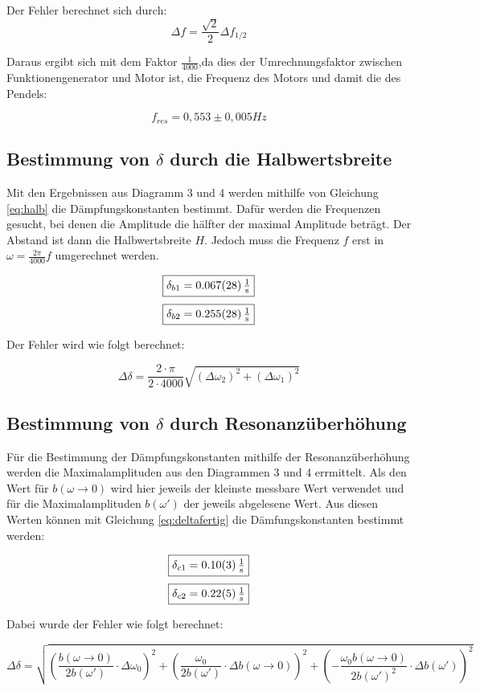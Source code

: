 Der Fehler berechnet sich durch:
\begin{equation}
    \Delta f = \frac{\sqrt{2}}{2}\Delta f_{1/2}
\end{equation}

Daraus ergibt sich mit dem Faktor $\frac{1}{4000}$,da dies der Umrechnungsfaktor zwischen Funktionengenerator und Motor ist, die Frequenz des Motors und damit die des Pendels:

\[\boxed{f_{res} = 0,553 \pm 0,005 \si{Hz}}\]

\subsection{Bestimmung von $\delta$ durch die Halbwertsbreite}

Mit den Ergebnissen aus Diagramm 3 und 4 werden mithilfe von Gleichung \ref{eq:halb} die Dämpfungskonstanten bestimmt.
Dafür werden die Frequenzen gesucht, bei denen die Amplitude die hälfter der maximal Amplitude beträgt. Der Abstand ist dann die Halbwertsbreite $H$.
Jedoch muss die Frequenz $f$ erst in $\omega = \frac{2 \pi}{4000} f$ umgerechnet werden.

\[\boxed{\delta_{b1}= \SI{0,067 \pm 0,028}{\tfrac{1}{\second}}}\]
\[\boxed{\delta_{b2} = \SI{0,255 \pm 0,028}{\tfrac{1}{\second}}}\]

Der Fehler wird wie folgt berechnet:

\begin{equation}
    \Delta \delta = \frac{2 \cdot \pi}{2 \cdot 4000}\sqrt{(\Delta\omega_2)^2+ (\Delta\omega_1)^2}
\end{equation}
\newpage

\subsection{Bestimmung von $\delta$ durch Resonanzüberhöhung}

Für die Bestimmung der Dämpfungskonstanten mithilfe der Resonanzüberhöhung werden die Maximalamplituden aus den Diagrammen 3 und 4 errmittelt.
Als den Wert für $b(\omega \rightarrow 0)$ wird hier jeweils der kleinste messbare Wert verwendet und für die Maximalamplituden $b(\omega')$ der jeweils abgelesene Wert.
Aus diesen Werten können mit Gleichung \ref{eq:deltafertig} die Dämfungskonstanten bestimmt werden:

\[\boxed{\delta_{c1} = \SI{0,10 \pm 0,03}{\tfrac{1}{\second}}}\]
\[\boxed{\delta_{c2} = \SI{0,22 \pm 0,05}{\tfrac{1}{\second}}}\]

Dabei wurde der Fehler wie folgt berechnet:

\begin{equation}
    \Delta \delta = \sqrt{
\left( \frac{b(\omega \to 0)}{2 b(\omega')} \cdot \Delta \omega_0 \right)^2
+ \left( \frac{\omega_0}{2 b(\omega')} \cdot \Delta b(\omega \to 0) \right)^2
+ \left( - \frac{\omega_0 b(\omega \to 0)}{2 b(\omega')^2} \cdot \Delta b(\omega') \right)^2
}
\end{equation}
